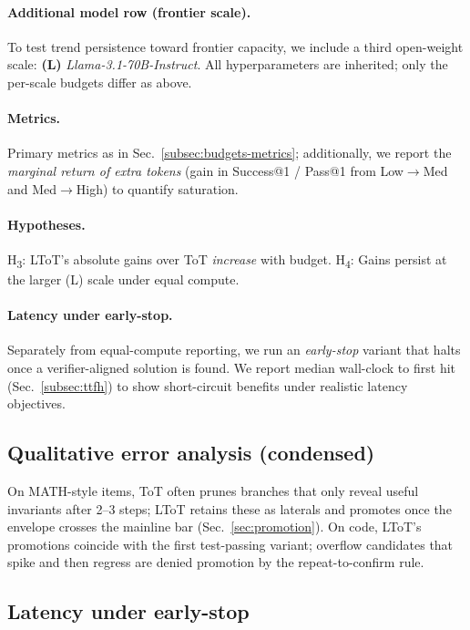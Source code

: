 \documentclass{article}
\begin{document}
\paragraph{Additional model row (frontier scale).}
To test trend persistence toward frontier capacity, we include a third open-weight scale:
\textbf{(L)} \emph{Llama-3.1-70B-Instruct}.
All hyperparameters are inherited; only the per-scale budgets differ as above.

\paragraph{Metrics.}
Primary metrics as in Sec.~\ref{subsec:budgets-metrics}; additionally, we report the \emph{marginal return of extra tokens} (gain in Success@1 / Pass@1 from Low$\to$Med and Med$\to$High) to quantify saturation.

\paragraph{Hypotheses.}
H\textsubscript{3}: LToT's absolute gains over ToT \emph{increase} with budget.
H\textsubscript{4}: Gains persist at the larger (L) scale under equal compute.

\paragraph{Latency under early-stop.}
Separately from equal-compute reporting, we run an \emph{early-stop} variant that halts once a verifier-aligned solution is found.
We report median wall-clock to first hit (Sec.~\ref{subsec:ttfh}) to show short-circuit benefits under realistic latency objectives.



\subsection{Qualitative error analysis (condensed)}
\label{subsec:qualitative}
On MATH-style items, ToT often prunes branches that only reveal useful invariants after 2--3 steps; LToT retains these as laterals and promotes once the envelope crosses the mainline bar (Sec.~\ref{sec:promotion}).
On code, LToT's promotions coincide with the first test-passing variant; overflow candidates that spike and then regress are denied promotion by the repeat-to-confirm rule.


\subsection{Latency under early-stop}
\label{subsec:frontier-results-latency}
\end{document}
